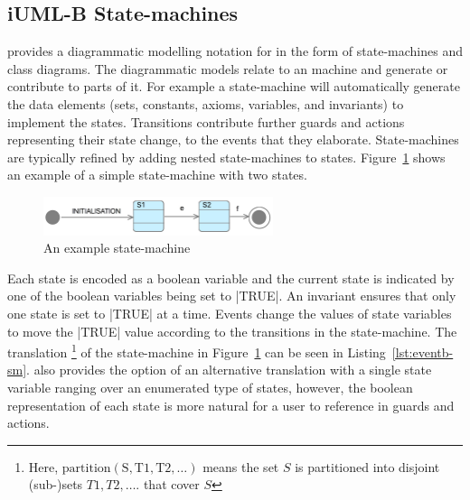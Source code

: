 
\subsection{iUML-B State-machines}
\label{sec:iumlb}

\iUMLB provides a diagrammatic modelling notation for \EventB in the form of state-machines and class diagrams. 
The diagrammatic models relate to an \EventB machine and generate or contribute to parts of it. 
For example a state-machine will automatically generate the \EventB data elements (sets, constants, axioms, variables, and invariants) to implement the states. 
Transitions contribute further guards and actions representing their state change, to the events that they elaborate.  
State-machines are typically refined by adding nested state-machines to states.
Figure~\ref{fig:iumlb-sm} shows an example of a simple state-machine with two states.
\begin{figure}[!h]
	\vspace{-.5cm}
	\centering
	\includegraphics[width=0.6\textwidth]{figures/iumlb-SM}
	\caption{An example \iUMLB state-machine}
	\label{fig:iumlb-sm}
	\vspace{-.5cm}
\end{figure}

Each state is encoded as a boolean variable and the current state is indicated by one of the boolean variables being set to |TRUE|. 
An invariant ensures that only one state is set to |TRUE| at a time.
Events change the values of state variables to move the |TRUE| value according to the transitions in the state-machine.  
The \EventB translation%
%
\footnote{%
  Here, $\mathrm{partition(S, T1, T2, \ldots)}$ means the set $S$ is partitioned into disjoint (sub-)sets $T1, T2, \ldots$.
that cover $S$} 
of the state-machine in Figure~\ref{fig:iumlb-sm} can be seen in Listing~\ref{lst:eventb-sm}.
\iUMLB also provides the option of an alternative translation with a single state variable ranging over an enumerated type of states, however, the boolean representation of each state is more natural for a user to reference in \SCXML guards and actions.
	
